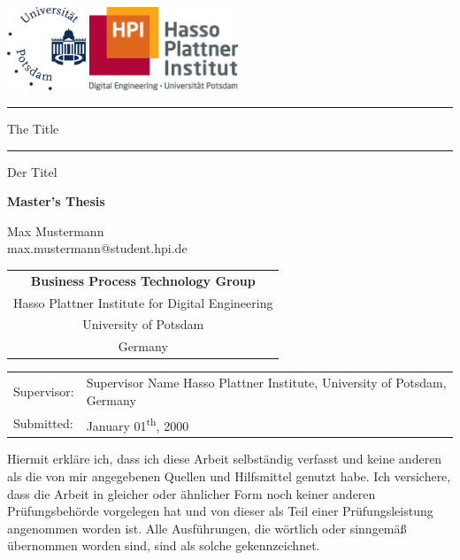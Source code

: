 {
\noindent
\begin{center}
\includegraphics[height=25mm]{layout/up}\hspace{2cm}
\includegraphics[height=25mm]{layout/hpi}

\vspace{20mm}
\hrule
\vspace{4mm}
{\Large The Title}
\par
\vspace{4mm}
\hrule
\vspace{4mm}
{Der Titel}
\par 
\vspace{7mm}
{\large\bfseries Master's Thesis}

\vspace{7mm}
Max Mustermann\\
{\sffamily\small max.mustermann@student.hpi.de}

\vspace{7mm}
\bgroup
\sffamily\small
\begin{tabular}{c}
\bfseries Business Process Technology Group \\
Hasso Plattner Institute for Digital Engineering \\
University of Potsdam \\
Germany
\end{tabular}
\egroup
\end{center}

\vfill
\noindent\begin{tabular}{lp{10cm}}
\sffamily Supervisor: & Supervisor Name \newline
\sffamily\small Hasso Plattner Institute, University of Potsdam, Germany \\[6mm]
\sffamily Submitted: & January 01\textsuperscript{th}, 2000
\end{tabular}
}
\cleardoublepage

\pagestyle{plain}
\hphantom{ }
\vfill
{}\par\vspace{2mm}
\par\vspace{1cm}
\noindent Hiermit erkläre ich, dass ich diese Arbeit selbständig verfasst und keine anderen als die von mir angegebenen Quellen und Hilfsmittel genutzt habe. Ich versichere, dass die Arbeit in gleicher oder ähnlicher Form noch keiner anderen Prüfungsbehörde vorgelegen hat und von dieser als Teil einer Prüfungsleistung angenommen worden ist. Alle Ausführungen, die wörtlich oder sinngemäß übernommen worden sind, sind als solche gekennzeichnet.

